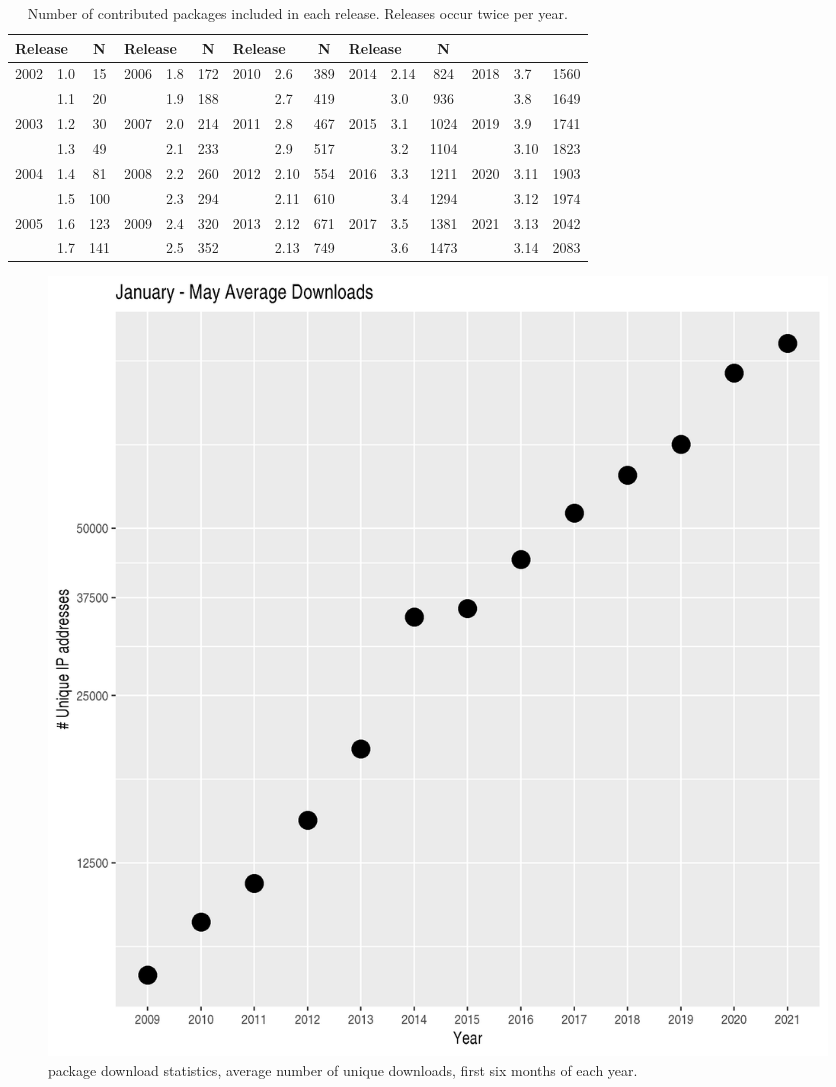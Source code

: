 \documentclass[letterpaper]{article}
\begin{document}
\begin{table}[b]
  \begin{center}
    \caption{Number of contributed packages included in each
      \Bioconductor{} release.  Releases occur twice per year.}
    \label{tbl:analysis_pkgs}
    \begin{tabular}{llc|llc|llc|llc|llc}
      \\
      \multicolumn{2}{l}{Release} & N & 
      \multicolumn{2}{l}{Release} & N & 
      \multicolumn{2}{l}{Release} & N &
      \multicolumn{2}{l}{Release} & N \\\hline\noalign{\smallskip}
      2002 & 1.0 & 15    & 2006 & 1.8 & 172  & 2010 & 2.6 & 389 & 2014 & 2.14 & 824  & 2018 & 3.7  & 1560\\ 
           & 1.1 & 20    &      & 1.9 & 188  &      & 2.7 & 419 &      & 3.0  & 936  &      & 3.8  & 1649\\
      2003 & 1.2 & 30    & 2007 & 2.0 & 214  & 2011 & 2.8 & 467 & 2015 & 3.1  & 1024 & 2019 & 3.9  & 1741\\
           & 1.3 & 49    &      & 2.1 & 233  &      & 2.9 & 517 &      & 3.2  & 1104 &      & 3.10 & 1823\\
      2004 & 1.4 & 81    & 2008 & 2.2 & 260  & 2012 & 2.10 & 554& 2016 & 3.3  & 1211 & 2020 & 3.11 & 1903\\
           & 1.5 & 100   &      & 2.3 & 294  &      & 2.11 & 610&      & 3.4  & 1294 &      & 3.12 & 1974\\
      2005 & 1.6 & 123   & 2009 & 2.4 & 320  & 2013 & 2.12 & 671& 2017 & 3.5  & 1381 & 2021 & 3.13 & 2042\\
           & 1.7 & 141   &      & 2.5 & 352  &      & 2.13 & 749&      & 3.6  & 1473 &      & 3.14 & 2083\\
    \end{tabular}
  \end{center}
\end{table}

\begin{figure}
  \begin{center}
    \includegraphics[width=.5\textwidth,height=!]{download-stats-2021}
    \caption{\Bioconductor{} package download statistics, average number
      of unique downloads, first six months of each year.}
    \label{fig:download-stats}
  \end{center}
\end{figure}
\end{document}
